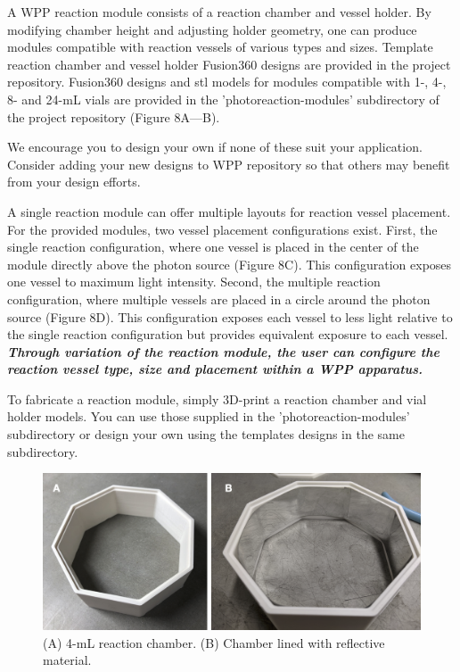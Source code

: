 \documentclass[11pt]{article}
\begin{document}
A WPP reaction module consists of a reaction chamber and vessel holder.
By modifying chamber height and adjusting holder geometry, one can produce modules compatible with reaction vessels of various types and sizes.
Template reaction chamber and vessel holder Fusion360 designs are provided in the project repository.
Fusion360 designs and stl models for modules compatible with 1-, 4-, 8- and 24-mL vials are provided in the 'photoreaction-modules' subdirectory of the project repository (Figure 8A—B).

We encourage you to design your own if none of these suit your application.
Consider adding your new designs to WPP repository so that others may benefit from your design efforts.

A single reaction module can offer multiple layouts for reaction vessel placement.
For the provided modules, two vessel placement configurations exist.
First, the single reaction configuration, where one vessel is placed in the center of the module directly above the photon source (Figure 8C).
This configuration exposes one vessel to maximum light intensity.
Second, the multiple reaction configuration, where multiple vessels are placed in a circle around the photon source (Figure 8D).
This configuration exposes each vessel to less light relative to the single reaction configuration but provides equivalent exposure to each vessel.
\textbf{\textit{Through variation of the reaction module, the user can configure the reaction vessel type, size and placement within a WPP apparatus.}}

To fabricate a reaction module, simply 3D-print a reaction chamber and vial holder models. You can use those supplied in the 'photoreaction-modules' subdirectory or design your own using the templates designs in the same subdirectory.

\begin{figure}[H]
	\centering
	\includegraphics[width=\textwidth]{"./fig9.png"}
	\caption{(A) 4-mL reaction chamber. (B) Chamber lined with reflective material.}
\end{figure}
\end{document}
